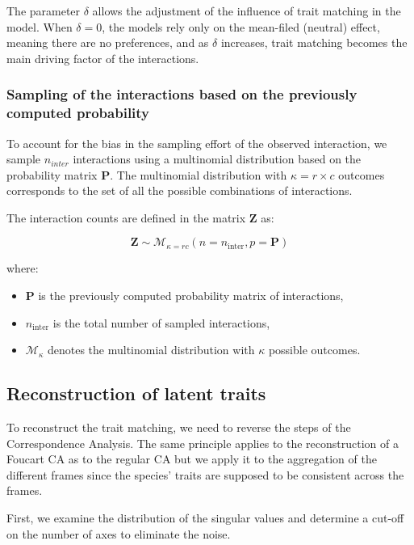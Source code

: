 The parameter $\delta$ allows the adjustment of the influence of trait matching in the model. When $\delta = 0$, the models rely only on the mean-filed (neutral) effect, meaning there are no preferences, and as $\delta$ increases, trait matching becomes the main driving factor of the interactions.



\subsubsection{Sampling of the interactions based on the previously computed probability}

To account for the bias in the sampling effort of the observed interaction, we sample $n_{inter}$ interactions using a multinomial distribution based on the probability matrix $\mathbf{P}$. The multinomial distribution with $\kappa = r \times c$ outcomes corresponds to the set of all the possible combinations of interactions.

The interaction counts are defined in the matrix $\mathbf{Z}$ as:

$$
    \mathbf{Z} \sim \mathcal{M}_{\kappa = rc}(n = n_\text{inter}, p = \mathbf{P})
$$

where:
\begin{itemize}
    \item $\mathbf{P}$ is the previously computed probability matrix of interactions,
    \item  $n_{\text{inter}}$ is the total number of sampled interactions,
    \item  $\mathcal{M}_{\kappa}$ denotes the multinomial distribution with \(\kappa\) possible outcomes.
\end{itemize}



\subsection{Reconstruction of latent traits}

To reconstruct the trait matching, we need to reverse the steps of the Correspondence Analysis. The same principle applies to the reconstruction of a Foucart CA as to the regular CA but we apply it to the  aggregation of the different frames since the species' traits are supposed to be consistent across the frames.

First, we examine the distribution of the singular values and determine a cut-off on the number of axes to eliminate the noise.

